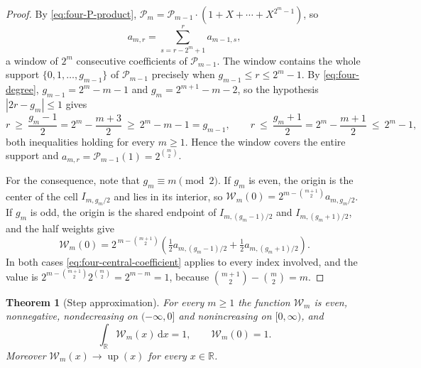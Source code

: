 \documentclass[11pt,oneside]{article}
\newtheorem{theorem}{Theorem}[section]
\theoremstyle{definition}
\theoremstyle{remark}
\newcommand{\R}{\mathbb R}
\newcommand{\Up}{\operatorname{up}}
\newcommand{\dd}{\,\mathrm d}
\begin{document}
\begin{proof}
By \eqref{eq:four-P-product}, $\mathcal P_m=\mathcal P_{m-1}\cdot(1+X+\cdots+X^{2^m-1})$, so
\begin{equation*}
 a_{m,r}=\sum_{s=r-2^m+1}^{r}a_{m-1,s},
\end{equation*}
a window of $2^m$ consecutive coefficients of $\mathcal P_{m-1}$.  The window contains the
whole support $\{0,1,\dots,g_{m-1}\}$ of $\mathcal P_{m-1}$ precisely when
$g_{m-1}\le r\le 2^m-1$.  By \eqref{eq:four-degree}, $g_{m-1}=2^m-m-1$ and
$g_m=2^{m+1}-m-2$, so the hypothesis $|2r-g_m|\le1$ gives
\begin{equation*}
 r\ \ge\ \frac{g_m-1}{2}=2^m-\frac{m+3}{2}\ \ge\ 2^m-m-1=g_{m-1},
 \qquad
 r\ \le\ \frac{g_m+1}{2}=2^m-\frac{m+1}{2}\ \le\ 2^m-1,
\end{equation*}
both inequalities holding for every $m\ge1$.  Hence the window covers the entire support and
$a_{m,r}=\mathcal P_{m-1}(1)=2^{\binom m2}$.

For the consequence, note that $g_m\equiv m\pmod 2$.  If $g_m$ is even, the origin is the
center of the cell $I_{m,g_m/2}$ and lies in its interior, so
$\mathcal W_m(0)=2^{m-\binom{m+1}{2}}a_{m,g_m/2}$.  If $g_m$ is odd, the origin is the shared
endpoint of $I_{m,(g_m-1)/2}$ and $I_{m,(g_m+1)/2}$, and the half weights give
\begin{equation*}
 \mathcal W_m(0)=2^{\,m-\binom{m+1}{2}}
 \left(\tfrac12 a_{m,(g_m-1)/2}+\tfrac12 a_{m,(g_m+1)/2}\right).
\end{equation*}
In both cases \eqref{eq:four-central-coefficient} applies to every index involved, and the
value is $2^{m-\binom{m+1}{2}}2^{\binom m2}=2^{m-m}=1$, because
$\binom{m+1}{2}-\binom m2=m$.
\end{proof}

\begin{theorem}[Step approximation]
\label{thm:four-step-approx}
For every $m\ge1$ the function $\mathcal W_m$ is even, nonnegative, nondecreasing on
$(-\infty,0]$ and nonincreasing on $[0,\infty)$, and
\begin{equation}
 \int_\R\mathcal W_m(x)\dd x=1,
 \qquad
 \mathcal W_m(0)=1.                                           \label{eq:four-step-normalizations}
\end{equation}
Moreover $\mathcal W_m(x)\to\Up(x)$ for every $x\in\R$.
\end{theorem}
\end{document}
